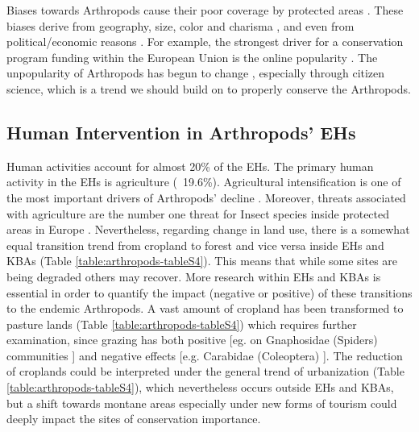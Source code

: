 Biases towards Arthropods cause their poor coverage by protected
areas \parencite{chowdhury2023protected,damen2013protected,delso2021protected}. These
biases derive from geography, size, color and charisma \parencite{cardoso2012habitats,mammola2020towards,wang2021out-of-sight},
and even from political/economic reasons \parencite{dias-silva2021protected}. For example,
the strongest driver for a conservation program funding within the European
Union is the online popularity \parencite{mammola2020towards}. The unpopularity of
Arthropods has begun to change \parencite{wagner2021insect}, especially through citizen
science, which is a trend we should build on to properly conserve the Arthropods.

    \subsection{Human Intervention in Arthropods’ EHs}
    \label{subsec:arthropods-human-intervention-ehs}
Human activities account for almost 20\% of the EHs. The primary human activity
in the EHs is agriculture (~19.6\%). Agricultural intensification is one of the
most important drivers of Arthropods’ decline \parencite{bruhl2019biodiversity,habel2019agricultural,raven2021agricultural}.
Moreover, threats associated with agriculture are the number one threat for
Insect species inside protected areas in Europe \parencite{chowdhury2023protected}.
Nevertheless, regarding change in land use, there is a somewhat equal
transition trend from cropland to forest and vice versa inside EHs and KBAs
(Table \ref{table:arthropods-tableS4}). This means that while some sites are being
degraded others may recover. More research within EHs and KBAs is essential in
order to quantify the impact (negative or positive) of these transitions to the
endemic Arthropods. A vast amount of cropland has been transformed to pasture
lands (Table \ref{table:arthropods-tableS4}) which requires further examination,
since grazing has both positive [eg. on Gnaphosidae (Spiders) communities \parencite{kaltsas2019overgrazed}]
and negative effects [e.g. Carabidae (Coleoptera) \parencite{kaltsas2013ground}].
The reduction of croplands could be interpreted under the general trend of
urbanization (Table \ref{table:arthropods-tableS4}), which nevertheless occurs
outside EHs and KBAs, but a shift towards montane areas especially under new
forms of tourism could deeply impact the sites of conservation importance.


